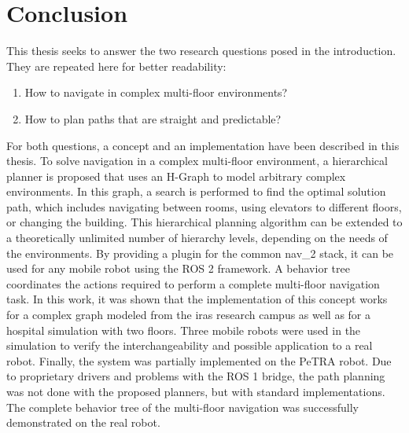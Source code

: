 \chapter{Conclusion}
\label{sec:conclusion}
This thesis seeks to answer the two research questions posed in the introduction. They are repeated here for better readability:

\begin{enumerate}
    \item How to navigate in complex multi-floor environments?
    \item How to plan paths that are straight and predictable?
\end{enumerate}

For both questions, a concept and an implementation have been described in this thesis. To solve navigation in a complex multi-floor environment, a hierarchical planner is proposed that uses an H-Graph to model arbitrary complex environments. In this graph, a search is performed to find the optimal solution path, which includes navigating between rooms, using elevators to different floors, or changing the building. This hierarchical planning algorithm can be extended to a theoretically unlimited number of hierarchy levels, depending on the needs of the environments. By providing a plugin for the common \gls{nav_2} stack, it can be used for any mobile robot using the ROS 2 framework. A behavior tree coordinates the actions required to perform a complete multi-floor navigation task. In this work, it was shown that the implementation of this concept works for a complex graph modeled from the \gls{iras} research campus as well as for a hospital simulation with two floors. Three mobile robots were used in the simulation to verify the interchangeability and possible application to a real robot. Finally, the system was partially implemented on the PeTRA robot. Due to proprietary drivers and problems with the ROS 1 bridge, the path planning was not done with the proposed planners, but with standard implementations. The complete behavior tree of the multi-floor navigation was successfully demonstrated on the real robot.

